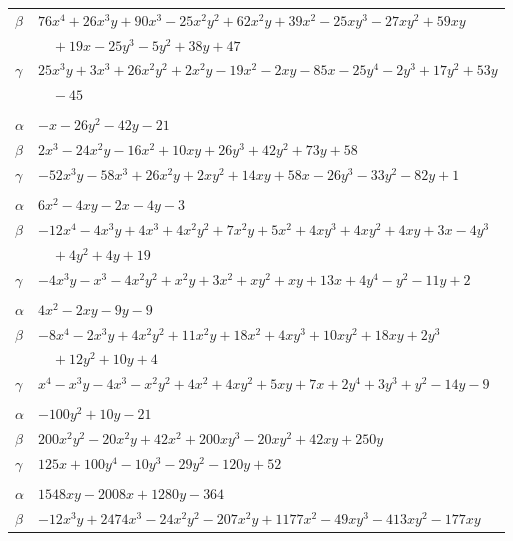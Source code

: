 \documentclass[11pt]{article}
\begin{document}
\begin{longtable}{@{}ll@{}}
$\beta$ & $76x^{4}+26x^{3}y+90x^{3}-25x^{2}y^{2}+62x^{2}y+39x^{2}-25xy^{3}-27xy^{2}+59xy$\\
 & $\quad +19x-25y^{3}-5y^{2}+38y+47$\\
$\gamma$ & $25x^{3}y+3x^{3}+26x^{2}y^{2}+2x^{2}y-19x^{2}-2xy-85x-25y^{4}-2y^{3}+17y^{2}+53y$\\
 & $\quad -45$\\
\addlinespace[3pt]
\multicolumn{2}{@{}l}{$\{i,j\}=\{14,59\}$, $k_{ij}=3\cdot 7$}\\
$\alpha$ & $-x-26y^{2}-42y-21$\\
$\beta$ & $2x^{3}-24x^{2}y-16x^{2}+10xy+26y^{3}+42y^{2}+73y+58$\\
$\gamma$ & $-52x^{3}y-58x^{3}+26x^{2}y+2xy^{2}+14xy+58x-26y^{3}-33y^{2}-82y+1$\\
\addlinespace[3pt]
\multicolumn{2}{@{}l}{$\{i,j\}=\{14,63\}$, $k_{ij}=3$}\\
$\alpha$ & $6x^{2}-4xy-2x-4y-3$\\
$\beta$ & $-12x^{4}-4x^{3}y+4x^{3}+4x^{2}y^{2}+7x^{2}y+5x^{2}+4xy^{3}+4xy^{2}+4xy+3x-4y^{3}$\\
 & $\quad +4y^{2}+4y+19$\\
$\gamma$ & $-4x^{3}y-x^{3}-4x^{2}y^{2}+x^{2}y+3x^{2}+xy^{2}+xy+13x+4y^{4}-y^{2}-11y+2$\\
\addlinespace[3pt]
\multicolumn{2}{@{}l}{$\{i,j\}=\{14,67\}$, $k_{ij}=3^{2}$}\\
$\alpha$ & $4x^{2}-2xy-9y-9$\\
$\beta$ & $-8x^{4}-2x^{3}y+4x^{2}y^{2}+11x^{2}y+18x^{2}+4xy^{3}+10xy^{2}+18xy+2y^{3}$\\
 & $\quad +12y^{2}+10y+4$\\
$\gamma$ & $x^{4}-x^{3}y-4x^{3}-x^{2}y^{2}+4x^{2}+4xy^{2}+5xy+7x+2y^{4}+3y^{3}+y^{2}-14y-9$\\
\addlinespace[3pt]
\multicolumn{2}{@{}l}{$\{i,j\}=\{14,68\}$, $k_{ij}=3\cdot 7$}\\
$\alpha$ & $-100y^{2}+10y-21$\\
$\beta$ & $200x^{2}y^{2}-20x^{2}y+42x^{2}+200xy^{3}-20xy^{2}+42xy+250y$\\
$\gamma$ & $125x+100y^{4}-10y^{3}-29y^{2}-120y+52$\\
\addlinespace[3pt]
\multicolumn{2}{@{}l}{$\{i,j\}=\{14,71\}$, $k_{ij}=2^{2}\cdot 7\cdot 13$}\\
$\alpha$ & $1548xy-2008x+1280y-364$\\
$\beta$ & $-12x^{3}y+2474x^{3}-24x^{2}y^{2}-207x^{2}y+1177x^{2}-49xy^{3}-413xy^{2}-177xy$\\

\end{longtable}
\end{document}
